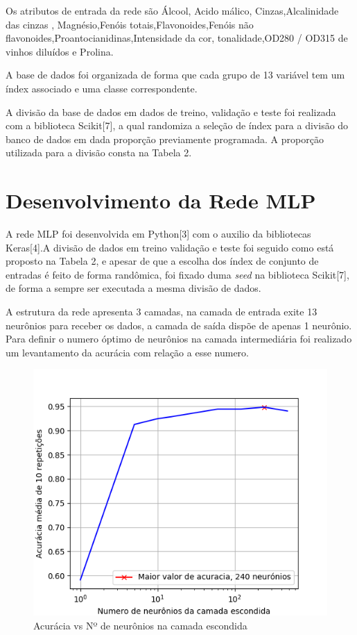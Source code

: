 Os atributos de entrada da rede são Álcool, Acido málico, Cinzas,Alcalinidade das cinzas , Magnésio,Fenóis totais,Flavonoides,Fenóis não flavonoides,Proantocianidinas,Intensidade da cor, tonalidade,OD280 / OD315 de vinhos diluídos e Prolina.

A base de dados foi organizada de forma que cada grupo de 13 variável tem um índex associado e uma classe correspondente.



 A divisão da base de dados em dados de treino, validação e teste foi realizada com a biblioteca Scikit[7], a qual randomiza a seleção de índex para a divisão do banco de dados em dada proporção previamente programada. A proporção utilizada para a divisão consta na Tabela 2.


 
\section{Desenvolvimento da Rede MLP}
A rede MLP foi desenvolvida em Python[3] com o auxilio da bibliotecas Keras[4].A divisão de dados em treino validação e teste foi seguido como está proposto na Tabela 2, e apesar de que a escolha dos índex de conjunto de entradas é feito de forma randômica, foi fixado duma \textit{seed} na biblioteca Scikit[7], de forma a sempre ser executada a mesma divisão de dados.

A estrutura da rede apresenta 3 camadas, na camada de entrada exite 13 neurônios para receber os dados, a camada de saída dispõe de apenas 1 neurônio. Para definir o numero óptimo de neurônios na camada intermediária foi realizado um levantamento da acurácia com relação a esse numero.

\begin{figure}[H]
\centering %
\includegraphics[width=\columnwidth]{04-Figuras/acuracia}
\caption{Acurácia vs Nº de neurônios na camada escondida}
\label{figura:acuracia}
\end{figure}

